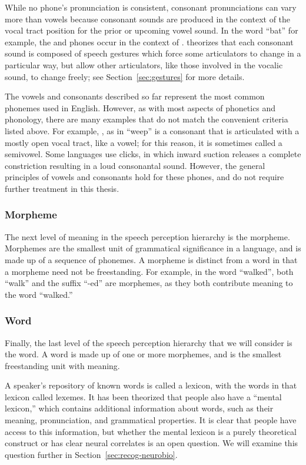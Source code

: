 While no phone's pronunciation is consistent,
consonant pronunciations can vary more than vowels
because consonant sounds are produced in the context
of the vocal tract position for
the prior or upcoming vowel sound.
In the word ``bat'' for example,
the \ipa{[b]} and \ipa{[t]} phones
occur in the context of \ipa{[\ae]}.
\citet{kroger1993} theorizes that
each consonant sound is composed
of speech gestures which force some
articulators to change in a particular way,
but allow other articulators,
like those involved in the vocalic sound,
to change freely;
see Section~\ref{sec:gestures}
for more details.

The vowels and consonants described so far
represent the most common phonemes used
in English.
However, as with most aspects
of phonetics and phonology,
there are many examples that do not
match the convenient criteria listed above.
For example, \ipa{[w]}, as in ``weep''
is a consonant that is articulated
with a mostly open vocal tract,
like a vowel;
for this reason, it is sometimes called a semivowel.
Some languages use clicks,
in which inward suction releases a complete constriction
resulting in a loud consonantal sound.
However, the general principles
of vowels and consonants hold
for these phones,
and do not require further treatment
in this thesis.

\subsubsection{Morpheme}

The next level of meaning in the
speech perception hierarchy
is the morpheme.
Morphemes are the smallest unit
of grammatical significance
in a language,
and is made up of a sequence
of phonemes.
A morpheme is distinct
from a word in that
a morpheme need not be freestanding.
For example, in the word
``walked'', both ``walk''
and the suffix ``-ed''
are morphemes,
as they both contribute
meaning to the word ``walked.''

\subsubsection{Word}

Finally, the last level
of the speech perception hierarchy
that we will consider is the word.
A word is made up of
one or more morphemes,
and is the smallest freestanding unit
with meaning.

A speaker's repository of known words
is called a lexicon,
with the words in that lexicon
called lexemes.
It has been theorized that
people also have a ``mental lexicon,''
which contains additional information
about words,
such as their meaning, pronunciation,
and grammatical properties.
It is clear that people have access
to this information,
but whether the mental lexicon
is a purely theoretical construct
or has clear neural correlates
is an open question.
We will examine this question
further in Section~\ref{sec:recog-neurobio}.

